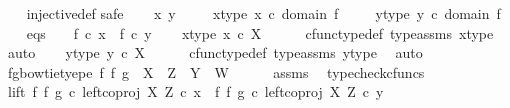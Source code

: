 \begin{isabellebody}
\ \ %
\endisadelimproof
%
\isatagproof
{}\isamarkupfalse%
\ injective{\isacharunderscore}{\kern0pt}def\isanewline
{}\isamarkupfalse%
{\isacharparenleft}{\kern0pt}safe{\isacharparenright}{\kern0pt}\isanewline
\ \ \isamarkupfalse%
\ x\ y\ \isanewline
\ \ \isamarkupfalse%
\ x{\isacharunderscore}{\kern0pt}type{\isacharcolon}{\kern0pt}\ {\isachardoublequoteopen}x\ {\isasymin}\isactrlsub c\ domain\ f{\isachardoublequoteclose}\ \isanewline
\ \ \isamarkupfalse%
\ y{\isacharunderscore}{\kern0pt}type{\isacharcolon}{\kern0pt}\ {\isachardoublequoteopen}y\ {\isasymin}\isactrlsub c\ domain\ f{\isachardoublequoteclose}\isanewline
\ \ \isamarkupfalse%
\ eqs{\isacharcolon}{\kern0pt}\ \ \ \ {\isachardoublequoteopen}f\ {\isasymcirc}\isactrlsub c\ x\ {\isacharequal}{\kern0pt}\ f\ {\isasymcirc}\isactrlsub c\ y{\isachardoublequoteclose}\isanewline
\isanewline
\ \ \isamarkupfalse%
\ x{\isacharunderscore}{\kern0pt}type{}{\isacharcolon}{\kern0pt}\ {\isachardoublequoteopen}x\ {\isasymin}\isactrlsub c\ X{\isachardoublequoteclose}\isanewline
\ \ \ \ \isamarkupfalse%
\ cfunc{\isacharunderscore}{\kern0pt}type{\isacharunderscore}{\kern0pt}def\ type{\isacharunderscore}{\kern0pt}assms{\isacharparenleft}{\kern0pt}{}{\isacharparenright}{\kern0pt}\ x{\isacharunderscore}{\kern0pt}type\ \isamarkupfalse%
\ auto\isanewline
\ \ \isamarkupfalse%
\ y{\isacharunderscore}{\kern0pt}type{}{\isacharcolon}{\kern0pt}\ {\isachardoublequoteopen}y\ {\isasymin}\isactrlsub c\ X{\isachardoublequoteclose}\isanewline
\ \ \ \ \isamarkupfalse%
\ cfunc{\isacharunderscore}{\kern0pt}type{\isacharunderscore}{\kern0pt}def\ type{\isacharunderscore}{\kern0pt}assms{\isacharparenleft}{\kern0pt}{}{\isacharparenright}{\kern0pt}\ y{\isacharunderscore}{\kern0pt}type\ \isamarkupfalse%
\ auto\isanewline
\ \ \isamarkupfalse%
\ fg{\isacharunderscore}{\kern0pt}bowtie{\isacharunderscore}{\kern0pt}tyepe{\isacharcolon}{\kern0pt}\ {\isachardoublequoteopen}{\isacharparenleft}{\kern0pt}f\ {\isasymbowtie}\isactrlsub f\ g{\isacharparenright}{\kern0pt}\ {\isacharcolon}{\kern0pt}\ X\ {\isasymCoprod}\ Z\ {\isasymrightarrow}\ Y\ {\isasymCoprod}\ W{\isachardoublequoteclose}\isanewline
\ \ \ \ \isamarkupfalse%
\ assms\ \isamarkupfalse%
\ typecheck{\isacharunderscore}{\kern0pt}cfuncs\isanewline
\ \ \isamarkupfalse%
\ lift{\isacharcolon}{\kern0pt}\ {\isachardoublequoteopen}{\isacharparenleft}{\kern0pt}f\ {\isasymbowtie}\isactrlsub f\ g{\isacharparenright}{\kern0pt}\ {\isasymcirc}\isactrlsub c\ left{\isacharunderscore}{\kern0pt}coproj\ X\ Z\ {\isasymcirc}\isactrlsub c\ x\ {\isacharequal}{\kern0pt}\ {\isacharparenleft}{\kern0pt}f\ {\isasymbowtie}\isactrlsub f\ g{\isacharparenright}{\kern0pt}\ {\isasymcirc}\isactrlsub c\ left{\isacharunderscore}{\kern0pt}coproj\ X\ Z\ {\isasymcirc}\isactrlsub c\ y{\isachardoublequoteclose}\isanewline

\end{isabellebody}
